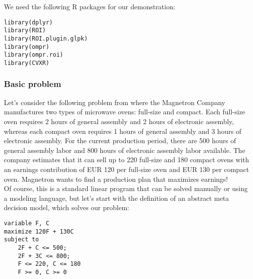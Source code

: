 \documentclass[a4paper]{article}\usepackage[]{graphicx}\usepackage[]{color}
\makeatletter
\newcommand{\hlstd}[1]{\textcolor[rgb]{0,0,0}{#1}}%
\newcommand{\hlkwd}[1]{\textcolor[rgb]{0,0,0}{#1}}%
\newenvironment{kframe}{%
 \def\at@end@of@kframe{}%
 \ifinner\ifhmode%
  \def\at@end@of@kframe{\end{minipage}}%
  \begin{minipage}{\columnwidth}%
 \fi\fi%
 \def\FrameCommand##1{\hskip\@totalleftmargin \hskip-\fboxsep
 \colorbox{shadecolor}{##1}\hskip-\fboxsep
     \hskip-\linewidth \hskip-\@totalleftmargin \hskip\columnwidth}%
 \MakeFramed {\advance\hsize-\width
   \@totalleftmargin\z@ \linewidth\hsize
   \@setminipage}}%
 {\par\unskip\endMakeFramed%
 \at@end@of@kframe}
\newenvironment{knitrout}{}{} %
\makeatother
\begin{document}
We need the following R packages for our demonstration:

\begin{knitrout}
\color{fgcolor}\begin{kframe}
\begin{alltt}
\hlkwd{library}\hlstd{(dplyr)}
\hlkwd{library}\hlstd{(ROI)}
\hlkwd{library}\hlstd{(ROI.plugin.glpk)}
\hlkwd{library}\hlstd{(ompr)}
\hlkwd{library}\hlstd{(ompr.roi)}
\hlkwd{library}\hlstd{(CVXR)}
\end{alltt}
\end{kframe}
\end{knitrout}


\subsubsection{Basic problem}
Let's consider the following problem from \cite{BertsimasFreund2000} where 
the Magnetron Company manufactures two types of microwave ovens: 
full-size and compact. 
Each full-size oven requires 2 hours of general assembly and 2 hours of 
electronic assembly, whereas each compact oven requires 1 hours of general 
assembly and 3 hours of electronic assembly. 
For the current production period, there are 500 hours of general assembly 
labor and 800 hours of electronic assembly labor available. 
The company estimates that it can sell up to 220 full-size and 180 compact 
ovens with an earnings contribution of EUR 120 per full-size oven and 
EUR 130 per compact oven. 
Magnetron wants to find a production plan that maximizes earnings! \\
 
Of course, this is a standard linear program that can be solved manually 
or using a modeling language, but let's start with the definition of an 
abstract meta decision model, which solves our problem:
\begin{verbatim}
variable F, C
maximize 120F + 130C
subject to
    2F + C <= 500;
    2F + 3C <= 800;
    F <= 220, C <= 180
    F >= 0, C >= 0
\end{verbatim}
\end{document}
